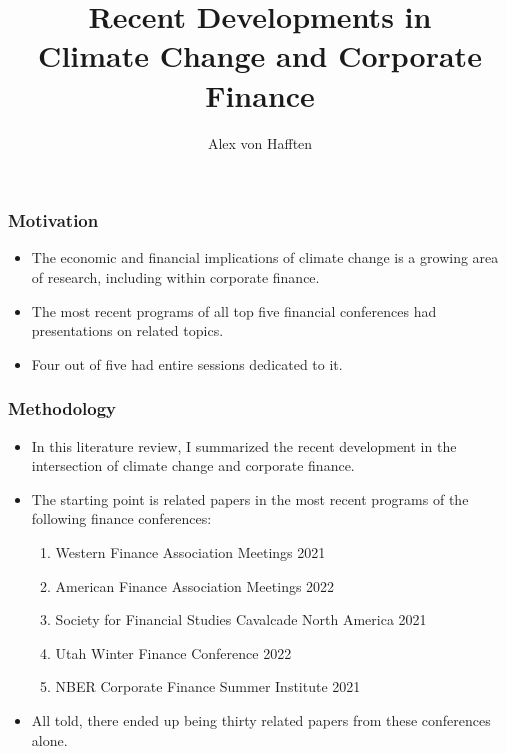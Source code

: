 \documentclass[handout]{beamer}
\title[Climate Change and Corporate Finance]{Recent Developments in \\ Climate Change and Corporate Finance}
\author{Alex von Hafften}
\institute{UW-Madison}
\begin{document}
\begin{frame}
\titlepage
\end{frame}

\begin{frame}
\frametitle{Motivation}

\begin{itemize}[<+->]

\item The economic and financial implications of climate change is a growing area of research, including within corporate finance.

\bigskip

\item The most recent programs of all top five financial conferences had presentations on related topics.

\bigskip

\item Four out of five had entire sessions dedicated to it.

\end{itemize}

\end{frame}

\begin{frame}
\frametitle{Methodology}

\begin{itemize}[<+->]

\item In this literature review, I summarized the recent development in the intersection of climate change and corporate finance.

\bigskip

\item The starting point is related papers in the most recent programs of the following finance conferences:

\begin{enumerate}

\item Western Finance Association Meetings 2021
\item American Finance Association Meetings 2022
\item Society for Financial Studies Cavalcade North America 2021
\item Utah Winter Finance Conference 2022
\item NBER Corporate Finance Summer Institute 2021

\end{enumerate}

\bigskip

\item All told, there ended up being thirty related papers from these conferences alone.

\end{itemize}

\end{frame}
\end{document}
